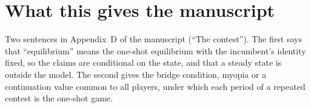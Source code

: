 \documentclass[11pt]{article}
\begin{document}
\section{What this gives the manuscript}

Two sentences in Appendix~D of the manuscript (``The contest''). The first says
that ``equilibrium'' means the one-shot equilibrium with the incumbent's
identity fixed, so the claims are conditional on the state, and that a steady
state is outside the model. The second gives the bridge condition, myopia or a
continuation value common to all players, under which each period of a
repeated contest is the one-shot game.



\end{document}
